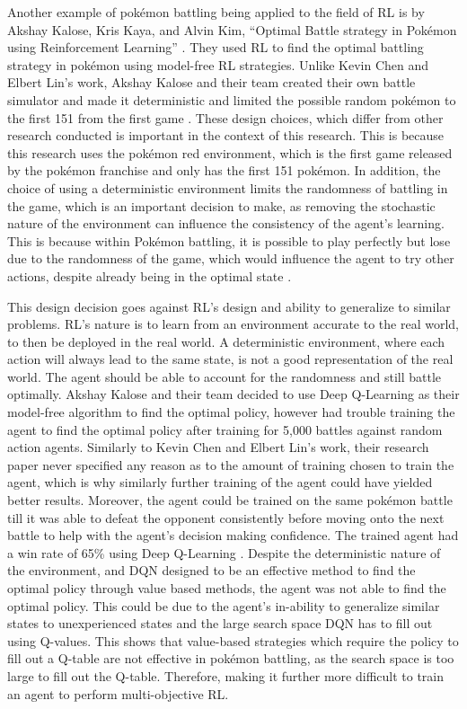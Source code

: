 Another example of pokémon battling being applied to the field of RL is by Akshay Kalose, Kris Kaya, and Alvin Kim, ``Optimal Battle strategy in Pokémon using Reinforcement Learning'' \cite{kalose2018optimal}. They used RL to find the optimal battling strategy in pokémon using model-free RL strategies. Unlike Kevin Chen and Elbert Lin's work, Akshay Kalose and their team created their own battle simulator and made it deterministic and limited the possible random pokémon to the first 151 from the first game \cite{kalose2018optimal}. These design choices, which differ from other research conducted is important in the context of this research. This is because this research uses the pokémon red environment, which is the first game released by the pokémon franchise and only has the first 151 pokémon. In addition, the choice of using a deterministic environment limits the randomness of battling in the game, which is an important decision to make, as removing the stochastic nature of the environment can influence the consistency of the agent's learning. This is because within Pokémon battling, it is possible to play perfectly but lose due to the randomness of the game, which would influence the agent to try other actions, despite already being in the optimal state \cite{kalose2018optimal}. 

This design decision goes against RL's design and ability to generalize to similar problems. RL's nature is to learn from an environment accurate to the real world, to then be deployed in the real world. A deterministic environment, where each action will always lead to the same state, is not a good representation of the real world. The agent should be able to account for the randomness and still battle optimally. Akshay Kalose and their team decided to use Deep Q-Learning as their model-free algorithm to find the optimal policy, however had trouble training the agent to find the optimal policy after training for 5,000 battles against random action agents. Similarly to Kevin Chen and Elbert Lin's work, their research paper never specified any reason as to the amount of training chosen to train the agent, which is why similarly further training of the agent could have yielded better results. Moreover, the agent could be trained on the same pokémon battle till it was able to defeat the opponent consistently before moving onto the next battle to help with the agent's decision making confidence. The trained agent had a win rate of 65\% using Deep Q-Learning \cite{kalose2018optimal}. Despite the deterministic nature of the environment, and DQN designed to be an effective method to find the optimal policy through value based methods, the agent was not able to find the optimal policy. This could be due to the agent's in-ability to generalize similar states to unexperienced states and the large search space DQN has to fill out using Q-values. This shows that value-based strategies which require the policy to fill out a Q-table are not effective in pokémon battling, as the search space is too large to fill out the Q-table. Therefore, making it further more difficult to train an agent to perform multi-objective RL.


